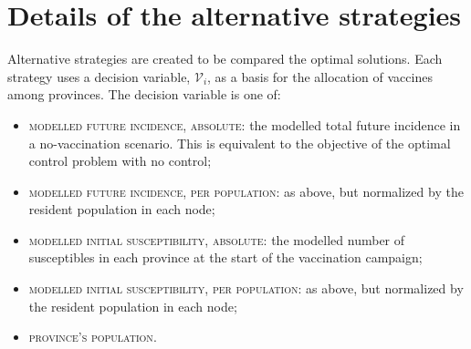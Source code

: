 \section{Details of the alternative strategies}
Alternative strategies are created to be compared the optimal solutions. Each strategy uses a decision variable, $\mathcal{V}_i$, as a basis for the allocation of vaccines among provinces. The decision variable is one of:
\begin{itemize}
    \item \textsc{modelled future incidence, absolute}: the modelled total future incidence in a no-vaccination scenario. This is equivalent to the objective of the optimal control problem with no control;
    \item \textsc{modelled future incidence, per population}: as above, but normalized by the resident population in each node;
    \item \textsc{modelled initial susceptibility, absolute}: the modelled number of susceptibles in each province at the start of the vaccination campaign;
    \item \textsc{modelled initial susceptibility, per population}: as above, but normalized by the resident population in each node;
    \item \textsc{province's population}.
\end{itemize}

